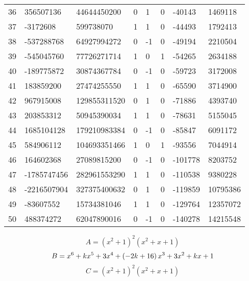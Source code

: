 \documentclass{amsart}
\begin{document}
\begin{longtable}{|l|l|l|lllll|}
36&356507136&44644450200&0&1&0&-40143&1469118\\
37&-3172608&599738070&1&1&0&-44493&1792413\\
38&-537288768&64927994272&0&-1&0&-49194&2210504\\
39&-545045760&77726271714&1&0&1&-54265&2634188\\
40&-189775872&30874367784&0&-1&0&-59723&3172008\\
41&183859200&27474255550&1&1&0&-65590&3714900\\
42&967915008&129855311520&0&1&0&-71886&4393740\\
43&203853312&50945390034&1&1&0&-78631&5155045\\
44&1685104128&179210983384&0&-1&0&-85847&6091172\\
45&584906112&104693351466&1&0&1&-93556&7044914\\
46&164602368&27089815200&0&-1&0&-101778&8203752\\
47&-1785747456&282961553290&1&1&0&-110538&9380228\\
48&-2216507904&327375400632&0&1&0&-119859&10795386\\
49&-83607552&15734381046&1&1&0&-129764&12357072\\
50&488374272&62047890016&0&-1&0&-140278&14215548\\
\hline
\end{longtable}
$$A=(x^2
 + 1)^{2}(x^2
 + x
 + 1)$$
$$B=x^6
 + k\*x^5
 + 3\*x^4
 + \left(-2\*k
 + 16\right) \*x^3
 + 3\*x^2
 + k\*x
 + 1$$
$$C=(x^2
 + 1)^{2}(x^2
 + x
 + 1)$$
\end{document}
